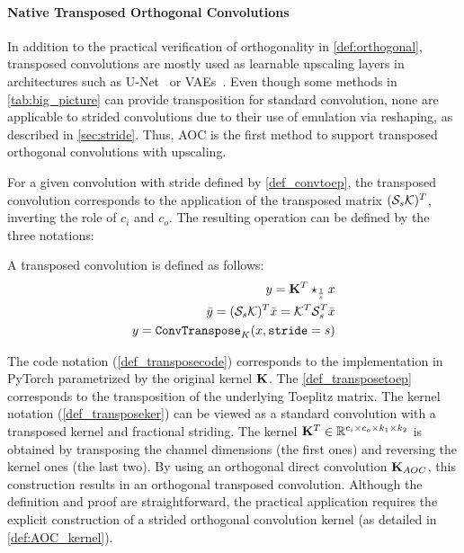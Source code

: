     
\paragraph{Native Transposed Orthogonal Convolutions}\label{sec:transpose}

    In addition to the practical verification of orthogonality in  \cref{def:orthogonal}, transposed convolutions are mostly used as learnable upscaling layers in architectures such as U-Net~\cite{ronneberger2015u} or VAEs~\cite{kingma2013auto,van2017neural}. Even though some methods in \cref{tab:big_picture} can provide transposition for standard convolution, none are applicable to strided convolutions due to their use of emulation via reshaping, as described in \cref{sec:stride}. Thus, AOC is the first method to support transposed orthogonal convolutions with upscaling.
    
    For a given convolution with stride defined by  \cref{def_convtoep}, the transposed convolution corresponds to the application of the transposed matrix $(\mathcal{S}_{s} \mathcal{K})^T$, inverting the role of $c_i$ and $c_o$. 
    The resulting operation can be defined by the three notations:
    \begin{definition}\label{def_transpose}
        A transposed convolution is defined as follows:
        \begin{align}
            y = \mathbf{K}^T \star_{\frac{1}{s}} x \label{def_transposeker}\\
            \bar{y} = (\mathcal{S}_{s} \mathcal{K})^T \bar{x} = \mathcal{K}^T \mathcal{S}_{s}^T \bar{x} \label{def_transposetoep} \\
            y = \mathtt{ConvTranspose}_{K}(x, \mathtt{stride}=s) \label{def_transposecode}
        \end{align}
    \end{definition}
        The code notation (\cref{def_transposecode}) corresponds to the implementation in PyTorch parametrized by the original kernel $\mathbf{K}$. The \cref{def_transposetoep} corresponds to the transposition of the underlying Toeplitz matrix. %
        The kernel notation (\cref{def_transposeker}) can be viewed as a standard convolution with a transposed kernel and fractional striding. The kernel $\mathbf{K}^T \in \mathbb{R}^{c_i \times c_o \times k_1 \times k_2}$ is obtained by transposing the channel dimensions (the first ones) and reversing the kernel ones (the last two). 
    By using an orthogonal direct convolution $\mathbf{K}_{AOC}$, this construction results in an orthogonal transposed convolution. Although the definition and proof are straightforward, the practical application requires the explicit construction of a strided orthogonal convolution kernel (as detailed in \cref{def:AOC_kernel}).

